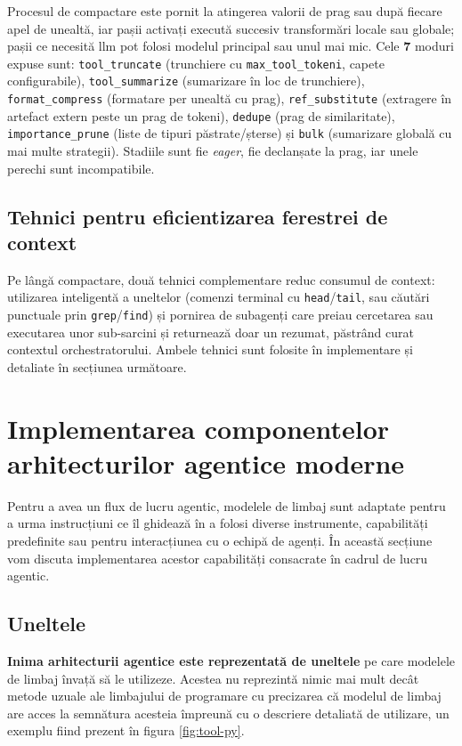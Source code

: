\documentclass[12pt, a4paper, oneside, romanian]{teza-upb}
\begin{document}
      Procesul de compactare este pornit la atingerea valorii de prag sau după fiecare apel de unealtă, iar pașii activați execută succesiv transformări locale sau globale; pașii ce necesită \ac{llm} pot folosi modelul principal sau unul mai mic. Cele \textbf{7} moduri expuse sunt: \texttt{tool\_truncate} (trunchiere cu \texttt{max\_tool\_tokeni}, capete configurabile), \texttt{tool\_summarize} (sumarizare în loc de trunchiere), \texttt{format\_compress} (formatare per unealtă cu prag), \texttt{ref\_substitute} (extragere în artefact extern peste un prag de tokeni), \texttt{dedupe} (prag de similaritate), \texttt{importance\_prune} (liste de tipuri păstrate/șterse) și \texttt{bulk} (sumarizare globală cu mai multe strategii). Stadiile sunt fie \emph{eager}, fie declanșate la prag, iar unele perechi sunt incompatibile.
    
      \subsection{Tehnici pentru eficientizarea ferestrei de context}

      Pe lângă compactare, două tehnici complementare reduc consumul de context: utilizarea inteligentă a uneltelor (comenzi terminal cu \texttt{head}/\texttt{tail}, sau căutări punctuale prin \texttt{grep}/\texttt{find}) și pornirea de subagenți care preiau cercetarea sau executarea unor sub-sarcini și returnează doar un rezumat, păstrând curat contextul orchestratorului. Ambele tehnici sunt folosite în implementare și detaliate în secțiunea următoare.

  \section{Implementarea componentelor arhitecturilor agentice moderne}

  Pentru a avea un flux de lucru agentic, modelele de limbaj sunt adaptate pentru a urma instrucțiuni ce îl ghidează în a folosi
  diverse instrumente, capabilități predefinite sau pentru interacțiunea cu o echipă de agenți. În această secțiune vom discuta implementarea acestor capabilități consacrate în cadrul de lucru agentic.

    \subsection{Uneltele}

    \textbf{Inima arhitecturii agentice este reprezentată de uneltele} pe care modelele de limbaj învață să le utilizeze. Acestea nu reprezintă nimic mai mult decât
    metode uzuale ale limbajului de programare cu precizarea că modelul de limbaj are acces la semnătura acesteia împreună cu o descriere detaliată de utilizare, un exemplu fiind prezent în figura \ref{fig:tool-py}.
\end{document}

